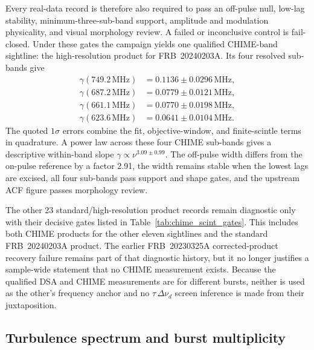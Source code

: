 Every real-data record is therefore also required to pass an off-pulse null,
low-lag stability, minimum-three-sub-band support, amplitude and modulation
physicality, and visual morphology review. A failed or inconclusive control is
fail-closed. Under these gates the campaign yields one qualified CHIME-band
sightline: the high-resolution product for FRB~20240203A. Its four resolved
sub-bands give
\begin{align}
\gamma(749.2\,\mathrm{MHz}) &= 0.1136 \pm 0.0296\,\mathrm{MHz}, \\
\gamma(687.2\,\mathrm{MHz}) &= 0.0779 \pm 0.0121\,\mathrm{MHz}, \\
\gamma(661.1\,\mathrm{MHz}) &= 0.0770 \pm 0.0198\,\mathrm{MHz}, \\
\gamma(623.6\,\mathrm{MHz}) &= 0.0641 \pm 0.0104\,\mathrm{MHz}.
\end{align}
The quoted $1\sigma$ errors combine the fit, objective-window, and
finite-scintle terms in quadrature. A power law across these four CHIME
sub-bands gives a descriptive within-band slope
$\gamma\propto\nu^{3.09\pm0.99}$. The off-pulse width differs from the
on-pulse reference by a factor 2.91, the width remains stable when the lowest
lags are excised, all four sub-bands pass support and shape gates, and the
upstream ACF figure passes morphology review.

The other 23 standard/high-resolution product records remain diagnostic only
with their decisive gates listed in Table~\ref{tab:chime_scint_gates}. This
includes both CHIME products for the other eleven sightlines and the standard
FRB~20240203A product. The earlier FRB~20230325A corrected-product recovery
failure remains part of that diagnostic history, but it no longer justifies a
sample-wide statement that no CHIME measurement exists. Because the qualified
DSA and CHIME measurements are for different bursts, neither is used as the
other's frequency anchor and no $\tau\,\Delta\nu_d$ screen inference is made
from their juxtaposition.



\FloatBarrier
\subsection{Turbulence spectrum and burst multiplicity}
\label{sec:results-alpha}

